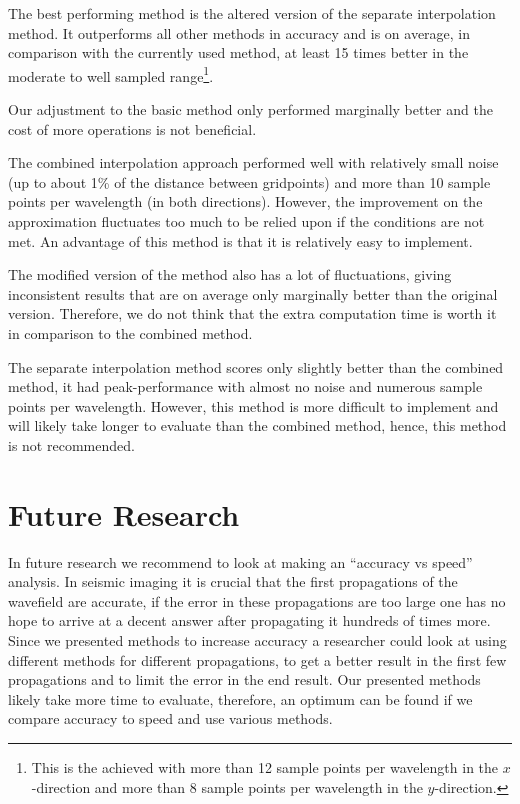 The best performing method is the altered version of the separate interpolation method. It outperforms all other methods in accuracy and is on average, in comparison with the currently used method, at least 15 times better in the moderate to well sampled range\footnote{This is the achieved with more than 12 sample points per wavelength in the $x$-direction and more than 8 sample points per wavelength in the $y$-direction.}.

Our adjustment to the basic method only performed marginally better and the cost of more operations is not beneficial.

The combined interpolation approach performed well with relatively small noise (up to about 1\% of the distance between gridpoints) and more than 10 sample points per wavelength (in both directions). However, the improvement on the approximation fluctuates too much to be relied upon if the conditions are not met. An advantage of this method is that it is relatively easy to implement.

The modified version of the method also has a lot of fluctuations, giving inconsistent results that are on average only marginally better than the original version. Therefore, we do not think that the extra computation time is worth it in comparison to the combined method.

The separate interpolation method scores only slightly better than the combined method, it had peak-performance with almost no noise and numerous sample points per wavelength. However, this method is more difficult to implement and will likely take longer to evaluate than the combined method, hence, this method is not recommended.



\section{Future Research}
\label{discussion}
In future research we recommend to look at making an ``accuracy vs speed'' analysis.
In seismic imaging it is crucial that the first propagations of the wavefield are accurate, if the error in these propagations are too large one has no hope to arrive at a decent answer after propagating it hundreds of times more.
Since we presented methods to increase accuracy a researcher could look at using different methods for different propagations, to get a better result in the first few propagations and to limit the error in the end result.
Our presented methods likely take more time to evaluate, therefore, an optimum can be found if we compare accuracy to speed and use various methods.

